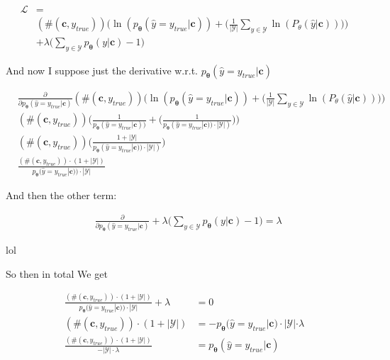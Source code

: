 \documentclass{article}
\newcommand{\vtheta}{\boldsymbol{\theta}}
\newcommand{\model}{p_{\vtheta}}
\newcommand{\context}{\boldsymbol{c}}
\begin{document}
		\begin{align}
			\mathcal{L} &=\\			
			&(\#(\context, y_{true}))\bigg(\ln(\model(\hat{y} = y_{true}|\context)) + \bigg(\frac{1}{|\mathcal{Y}|} \sum_{y\in\mathcal{Y}} \ln(P_\theta(\hat{y} | \context) )\bigg)\bigg) \\
			&+ \lambda\bigg(\sum_{y\in\mathcal{Y}}\model(y|\context) - 1 \bigg)
		\end{align}
		
		And now I suppose just the derivative w.r.t. $\model(\hat{y} = y_{true}|\context)$
		
		\begin{align}
			&\frac{\partial}{\partial \model(\hat{y} = y_{true}|\context)} (\#(\context, y_{true}))\bigg(\ln(\model(\hat{y} = y_{true}|\context)) + \bigg(\frac{1}{|\mathcal{Y}|} \sum_{y\in\mathcal{Y}} \ln(P_\theta(\hat{y} | \context) )\bigg)\bigg)\\
			&(\#(\context, y_{true}))\bigg(\frac{1}{\model(\hat{y} = y_{true}|\context))} + \bigg( \frac{1}{\model(\hat{y} = y_{true}|\context)) \cdot |\mathcal{Y}| )}\bigg)\bigg)\\
			&(\#(\context, y_{true})) \bigg( \frac{1 + |\mathcal{Y}|}{\model(\hat{y} = y_{true}|\context)) \cdot |\mathcal{Y}| )}\bigg)\\
			& \frac{(\#(\context, y_{true}))\cdot (1 + |\mathcal{Y}|)}{\model(\hat{y} = y_{true}|\context)) \cdot |\mathcal{Y}|}
		\end{align}
		
		And then the other term:
		
		\begin{align}
			&\frac{\partial}{\partial \model(\hat{y} = y_{true}|\context)} + \lambda\bigg(\sum_{y\in\mathcal{Y}}\model(y|\context) - 1 \bigg) = \lambda
		\end{align}
		
		lol
		
		So then in total We get
		
		\begin{align}
			\frac{(\#(\context, y_{true}))\cdot (1 + |\mathcal{Y}|)}{\model(\hat{y} = y_{true}|\context)) \cdot |\mathcal{Y}|} + \lambda &= 0\\
			(\#(\context, y_{true}))\cdot (1 + |\mathcal{Y}|) &= - \model(\hat{y} = y_{true}|\context) \cdot |\mathcal{Y}|\cdot \lambda \\
			\frac{(\#(\context, y_{true}))\cdot (1 + |\mathcal{Y}|)}{- |\mathcal{Y}|\cdot \lambda 	} &=  \model(\hat{y} = y_{true}|\context) 
		\end{align}
		
\end{document}
